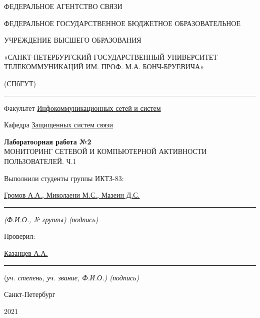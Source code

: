 \documentclass[a4paper,14pt]{extarticle}
\begin{document}
    \begin{center}
        \thispagestyle{empty}
        \begin{singlespace}
        ФЕДЕРАЛЬНОЕ АГЕНТСТВО СВЯЗИ

        ФЕДЕРАЛЬНОЕ ГОСУДАРСТВЕННОЕ БЮДЖЕТНОЕ ОБРАЗОВАТЕЛЬНОЕ

        УЧРЕЖДЕНИЕ ВЫСШЕГО ОБРАЗОВАНИЯ

        «САНКТ-ПЕТЕРБУРГСКИЙ ГОСУДАРСТВЕННЫЙ УНИВЕРСИТЕТ ТЕЛЕКОММУНИКАЦИЙ ИМ. ПРОФ. М.А. БОНЧ-БРУЕВИЧА»

        (СПбГУТ)
        \end{singlespace}
        \vspace{-1ex}
        \rule{\textwidth}{0.4pt}
        \vspace{-5ex}

        Факультет \underline{Инфокоммуникационных сетей и систем}

        Кафедра \underline{Защищенных систем связи}
        \vspace{10ex}

        \textbf{Лаборатоoрная работа №2}\\
        МОНИТОРИНГ СЕТЕВОЙ И КОМПЬЮТЕРНОЙ АКТИВНОСТИ ПОЛЬЗОВАТЕЛЕЙ. Ч.1
        


    \end{center}
    \vspace{4ex}
    \begin{flushright}
    \parbox{10 cm}{
    \begin{flushleft}
        Выполнили студенты группы ИКТЗ-83:

        \underline{Громов А.А., Миколаени М.С., Мазеин Д.С.} \hfill \rule[-0.85ex]{0.1\textwidth}{0.6pt}

        \footnotesize \textit{ (Ф.И.О., № группы) \hfill (подпись)} \normalsize

        Проверил:

        \underline{Казанцев А.А.} \hfill \rule[-0.85ex]{0.1\textwidth}{0.6pt}

        (\footnotesize \textit{уч. степень, уч. звание, Ф.И.О.) \hfill (подпись)} \normalsize

    \end{flushleft}
    }
    \end{flushright}
    \begin{center}
        \vfill
        Санкт-Петербург

        2021

    \end{center}
    \newpage
\end{document}
